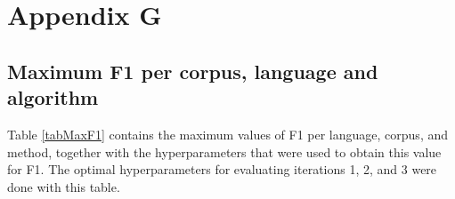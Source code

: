 \appendix 

\chapter{Appendix G}
\label{appendix:appSQL}
\section{Maximum F1 per corpus, language and algorithm}
\label{appSQLQueries}

Table \ref{tabMaxF1} contains the maximum values of F1 per language, corpus, and method, together with the hyperparameters that were used to obtain this value for F1. The optimal hyperparameters for evaluating iterations 1, 2, and 3 were done with this table.\\


